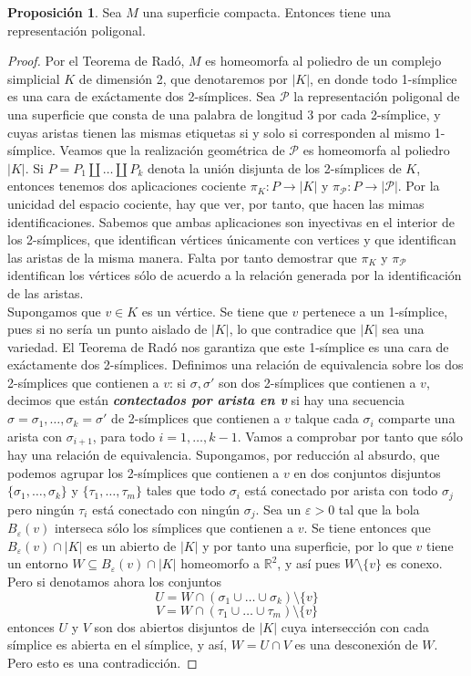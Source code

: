\documentclass[10pt]{report}
\newcommand{\R}{\mathbb{R}}
\newcommand{\enfatiza}[1]{\textbf{\textit{#1}}}
\theoremstyle{definition}
\newtheorem{prop}[defin]{Proposición}
\begin{document}
\begin{prop}\label{prop:superficie_tiene_representacion}%
Sea $M$ una superficie compacta. Entonces tiene una representación poligonal.
\end{prop}
\begin{proof}
Por el Teorema de Radó, $M$ es homeomorfa al poliedro de un complejo simplicial $K$ de dimensión 2, que denotaremos por $|K|$, en donde todo 1-símplice es una cara de exáctamente dos 2-símplices.
Sea $\mathcal{P}$ la representación poligonal de una superficie que consta de una palabra de longitud 3 por cada 2-símplice, y cuyas aristas tienen las mismas etiquetas si y solo si corresponden al mismo 1-símplice. Veamos que la realización geométrica de $\mathcal{P}$ es homeomorfa al poliedro $|K|$.
Si $P=P_1\amalg \dots \amalg P_k$ denota la unión disjunta de los 2-símplices de $K$, entonces tenemos dos aplicaciones cociente $\pi_K :P\to |K|$ y $\pi_{\mathcal{P}} :P\to |\mathcal{P}|$. Por la unicidad del espacio cociente, hay que ver, por tanto, que hacen las mimas identificaciones. Sabemos que ambas aplicaciones son inyectivas en el interior de los 2-símplices, que identifican vértices únicamente con vertices y que identifican las aristas de la misma manera. Falta por tanto demostrar que $\pi_K$ y $\pi_{\mathcal{P}}$ identifican los vértices sólo de acuerdo a la relación generada por la identificación de las aristas.\\
Supongamos que $v\in K$ es un vértice. Se tiene que $v$ pertenece a un 1-símplice, pues si no sería un punto aislado de $|K|$, lo que contradice que $|K|$ sea una variedad. El Teorema de Radó nos garantiza que este 1-símplice es una cara de exáctamente dos 2-símplices. Definimos una relación de equivalencia sobre los dos 2-símplices que contienen a $v$: si $\sigma , \sigma '$ son dos 2-símplices que contienen a $v$, decimos que están \enfatiza{contectados por arista en v} si hay una secuencia $\sigma =\sigma_1 ,\dots ,\sigma_k =\sigma '$ de 2-símplices que contienen a $v$ talque cada $\sigma_i$ comparte una arista con $\sigma_{i+1}$,  para todo $i=1,\dots , k-1$. Vamos a comprobar por tanto que sólo hay una relación de equivalencia. Supongamos, por reducción al absurdo, que podemos agrupar los 2-símplices que contienen a $v$ en dos conjuntos disjuntos $\{ \sigma_1 ,\dots ,\sigma_k \}$ y $\{ \tau_1 ,\dots ,\tau_m \}$ tales que todo $\sigma_i$ está conectado por arista con todo $\sigma_j$ pero ningún $\tau_i$ está conectado con ningún $\sigma_j$. Sea un $\varepsilon >0$ tal que la bola $B_{\varepsilon}(v)$ interseca sólo los símplices que contienen a $v$.  Se tiene entonces que $B_{\varepsilon}(v)\cap |K|$ es un abierto de $|K|$ y por tanto una superficie, por lo que $v$ tiene un entorno $W\subseteq B_{\varepsilon}(v)\cap |K|$ homeomorfo a $\R^2$, y así pues $W\setminus \{ v \}$ es conexo. 
Pero si denotamos ahora los conjuntos $$U=W\cap (\sigma_1 \cup \dots \cup \sigma_k )\setminus \{ v \}$$
$$V=W\cap (\tau_1 \cup \dots \cup \tau_m )\setminus \{ v \}$$ entonces $U$ y $V$ son dos abiertos disjuntos de $|K|$ cuya intersección con cada símplice es abierta en el símplice, y así, $W=U\cap V$ es una desconexión de $W$. Pero esto es una contradicción.
\end{proof}
\end{document}
